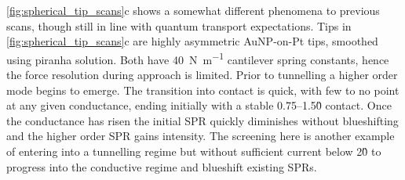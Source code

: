 \documentclass[a4paper]{article}
\begin{document}
\autoref{fig:spherical_tip_scans}c shows a somewhat different phenomena to previous scans, though still in line with quantum transport expectations. Tips in \autoref{fig:spherical_tip_scans}c are highly asymmetric AuNP-on-Pt tips, smoothed using piranha solution. Both have \SI{40}{N.m^{-1}} cantilever spring constants, hence the force resolution during approach is limited. Prior to tunnelling a higher order mode begins to emerge. The transition into contact is quick, with few to no point at any given conductance, ending initially with a stable 0.75--1.5\G0 contact.
Once the conductance has risen the initial SPR quickly diminishes without blueshifting and the higher order SPR gains intensity. The screening here is another example of entering into a tunnelling regime but without sufficient current below 2\G0 to progress into the conductive regime and blueshift existing SPRs.
\end{document}
